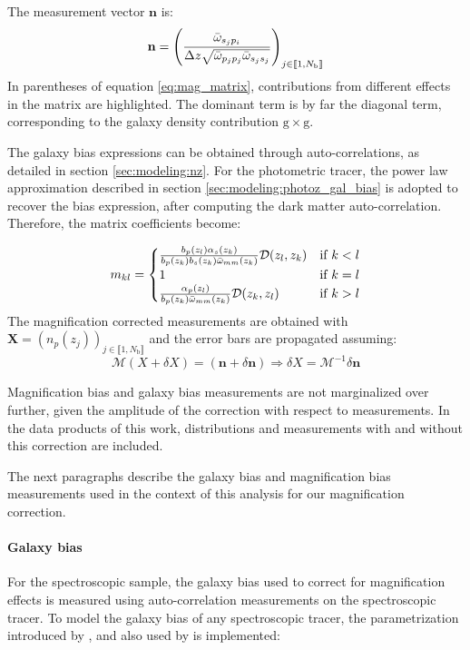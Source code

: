 \noindent The measurement vector $\mathbf{n}$ is:
\begin{equation}
    \mathbf{n}=\left(\frac{\bar{\omega}_{s_jp_i}}{\Delta z\sqrt{\bar{\omega}_{p_jp_j}\bar{\omega}_{s_js_j}}}\right)_{j\in\llbracket1,N_{\mathrm{b}}\rrbracket}
\end{equation}
In parentheses of equation \ref{eq:mag_matrix}, contributions from different effects in the matrix are highlighted. The dominant term is by far the diagonal term, corresponding to the galaxy density contribution $\mathrm{g}\times \mathrm{g}$.

The galaxy bias expressions can be obtained through auto-correlations, as detailed in section \ref{sec:modeling:nz}. For the photometric tracer, the power law approximation described in section \ref{sec:modeling:photoz_gal_bias} is adopted to recover the bias expression, after computing the dark matter auto-correlation. Therefore, the matrix coefficients become:

\begin{equation}
    m_{kl}=
    \begin{cases}
\frac{b_p(z_l)\alpha_s(z_k)}{b_p(z_k)b_s(z_k)\bar{\omega}_{mm}(z_k)}\mathcal{D}(z_l,z_k) & \text{if } k < l \\
1 & \text{if } k = l \\
\frac{\alpha_p(z_l)}{b_p(z_k)\bar{\omega}_{mm}(z_k)}\mathcal{D}(z_k,z_l) & \text{if } k > l
    \end{cases}
\end{equation}
The magnification corrected measurements are obtained with
$\mathbf{X}=(n_p(z_j))_{j\in\llbracket1,N_{\mathrm{b}}\rrbracket}$ and the error bars are propagated assuming: 
\begin{equation}
    \mathcal{M}(X+\delta X)=(\mathbf{n}+\delta\mathbf{n})\Rightarrow\delta X=\mathcal{M}^{-1}\delta\mathbf{n}
\end{equation} 

Magnification bias and galaxy bias measurements are not marginalized over further, given the amplitude of the correction with respect to measurements. In the data products of this work, distributions and measurements with and without this correction are included.

\label{sec:modeling:magnification:bias}

The next paragraphs describe the galaxy bias and magnification bias measurements used in the context of this analysis for our magnification correction.

\paragraph{Galaxy bias}\label{sec:modeling:magnification:bias:gal} 
For the spectroscopic sample, the galaxy bias used to correct for magnification effects is measured using auto-correlation measurements on the spectroscopic tracer. To model the galaxy bias of any spectroscopic tracer, the parametrization introduced by \cite{Laurent2017QSOBias}, and also used by \cite{Chaussidon2025QSOLRGPNG} is implemented:

